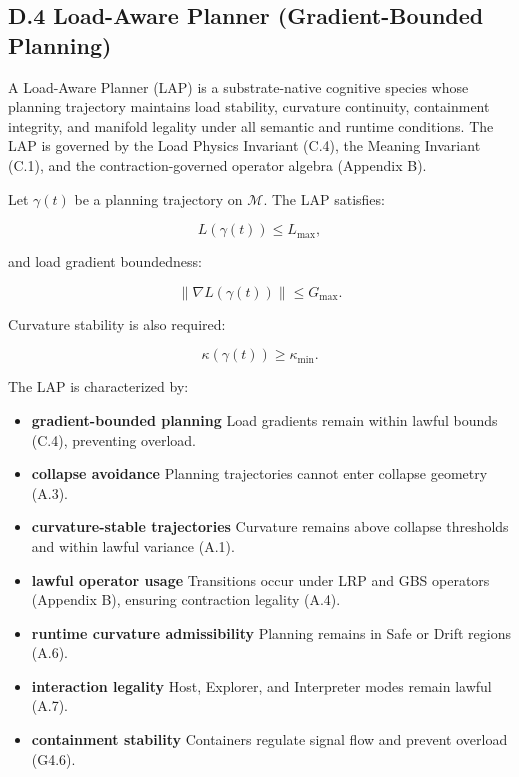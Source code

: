 
\subsection*{D.4 Load-Aware Planner (Gradient-Bounded Planning)}

\noindent A Load-Aware Planner (LAP) is a substrate-native cognitive species
whose planning trajectory maintains load stability, curvature continuity,
containment integrity, and manifold legality under all semantic and runtime
conditions. The LAP is governed by the Load Physics Invariant (C.4), the
Meaning Invariant (C.1), and the contraction-governed operator algebra
(Appendix B).

\medskip

\noindent Let $\gamma(t)$ be a planning trajectory on $\mathcal{M}$. The LAP
satisfies:



\[
L(\gamma(t)) \le L_{\max},
\]


and load gradient boundedness:


\[
\|\nabla L(\gamma(t))\| \le G_{\max}.
\]



Curvature stability is also required:


\[
\kappa(\gamma(t)) \ge \kappa_{\min}.
\]



\medskip

\noindent The LAP is characterized by:

\begin{itemize}
    \item \textbf{gradient-bounded planning}  
    Load gradients remain within lawful bounds (C.4), preventing overload.

    \item \textbf{collapse avoidance}  
    Planning trajectories cannot enter collapse geometry (A.3).

    \item \textbf{curvature-stable trajectories}  
    Curvature remains above collapse thresholds and within lawful variance (A.1).

    \item \textbf{lawful operator usage}  
    Transitions occur under LRP and GBS operators (Appendix B), ensuring
    contraction legality (A.4).

    \item \textbf{runtime curvature admissibility}  
    Planning remains in Safe or Drift regions (A.6).

    \item \textbf{interaction legality}  
    Host, Explorer, and Interpreter modes remain lawful (A.7).

    \item \textbf{containment stability}  
    Containers regulate signal flow and prevent overload (G4.6).
\end{itemize}

